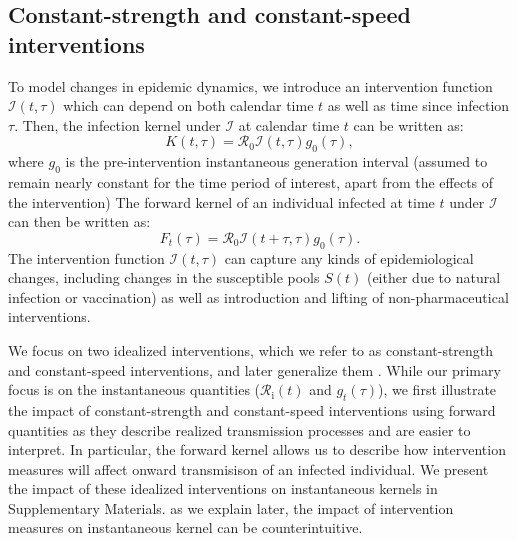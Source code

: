 \documentclass[12pt]{article}
\newcommand{\Rx}[1]{\ensuremath{{\mathcal R}_{#1}}\xspace}
\newcommand{\Ro}{\Rx{0}}
\newcommand{\Ri}{\Rx{\mathrm{i}}}
\newcommand{\II}{\ensuremath{\mathcal I}}
\begin{document}
\subsection{Constant-strength and constant-speed interventions}

To model changes in epidemic dynamics, we introduce an intervention function $\II(t, \tau)$ which can depend on both calendar time $t$ as well as time since infection $\tau$. 
Then, the infection kernel under $\II$ at calendar time $t$ can be written as:
\begin{equation}
K(t, \tau) = \Ro \II(t, \tau) g_0(\tau),
\end{equation}
where $g_0$ is the pre-intervention instantaneous generation interval (assumed to remain nearly constant for the time period of interest, apart from the effects of the intervention)
The forward kernel of an individual infected at time $t$ under $\II$ can then be written as:
\begin{equation}
F_t(\tau) =  \Ro \II(t + \tau, \tau) g_0(\tau).
\end{equation}
The intervention function $\II(t, \tau)$ can capture any kinds of epidemiological changes, including changes in the susceptible pools $S(t)$ (either due to natural infection or vaccination) as well as introduction and lifting of non-pharmaceutical interventions.

We focus on two idealized interventions, which we refer to as constant-strength and constant-speed interventions, and later generalize them \citep{dushoff2021speed}.
While our primary focus is on the instantaneous quantities ($\Ri(t)$ and $g_t(\tau)$), we first illustrate the impact of constant-strength and constant-speed interventions using forward quantities as they describe realized transmission processes and are easier to interpret.
In particular, the forward kernel allows us to describe how intervention measures will affect onward transmisison of an infected individual.
We present the impact of these idealized interventions on instantaneous kernels in Supplementary Materials. 
as we explain later, the impact of intervention measures on instantaneous kernel can be counterintuitive.
\end{document}
